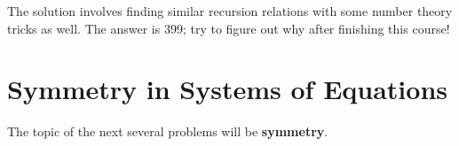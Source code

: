 The solution involves finding similar recursion relations with some number theory tricks as well. The answer is $399$; try to figure out why after finishing this course!

\clearpage

\section{Symmetry in Systems of Equations}
The topic of the next several problems will be \textbf{symmetry}.

\clearpage

